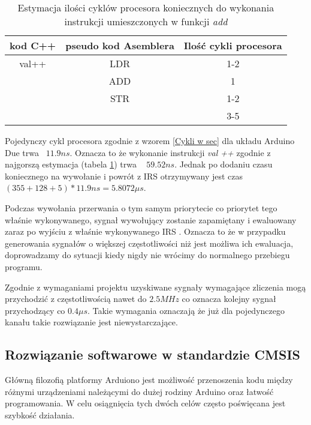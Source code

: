 \begin{table}{}
        \begin{center}
        \caption{Estymacja ilości cyklów procesora koniecznych do wykonania instrukcji umieszczonych w funkcji \textit{add} }
        \label{decompile add}
        \begin{tabular}{c|c|c}
                kod C++ & pseudo kod Asemblera & Ilość cykli procesora \cite{cycles} \\ \hline
                val++ & LDR & 1-2 \\
                        & ADD & 1 \\
                        & STR & 1-2 \\ 
                        \hline \hline
                        &   &  3-5 
        \end{tabular}
        \end{center}
\end{table}

Pojedynczy cykl procesora zgodnie z wzorem \ref{Cykli w sec} dla układu Arduino Due trwa ~$ 11.9 ns $. 
Oznacza to że wykonanie instrukcji \textit{val ++} zgodnie z najgorszą estymacja (tabela \ref{decompile add}) trwa ~ $59.52 ns$. 
Jednak po dodaniu czasu koniecznego na wywołanie i powrót z IRS otrzymywany jest czas $ (355 + 128 + 5) * 11.9 ns =  5.8072 \mu s $. 

Podczas wywołania przerwania o tym samym priorytecie co priorytet tego właśnie wykonywanego, sygnał wywołujący zostanie zapamiętany i ewaluowany zaraz po wyjściu z właśnie wykonywanego IRS  \cite{datasheet}. 
Oznacza to że w przypadku generowania sygnałów o większej częstotliwości niż jest możliwa ich ewaluacja, doprowadzamy do sytuacji kiedy nigdy nie wrócimy do normalnego przebiegu programu. 

Zgodnie z wymaganiami projektu uzyskiwane sygnały wymagające zliczenia mogą przychodzić z częstotliwością nawet do $2.5MHz$ co oznacza kolejny sygnał przychodzący co $0.4\mu s$.
Takie wymagania oznaczają że już dla pojedynczego kanału takie rozwiązanie jest niewystarczające. 

\subsection{Rozwiązanie softwarowe w standardzie CMSIS}
Główną filozofią platformy Arduiono jest możliwość przenoszenia kodu między różnymi urządzeniami należącymi do dużej rodziny Arduino oraz łatwość programowania.
W celu osiągnięcia tych dwóch celów często poświęcana jest szybkość działania. 

